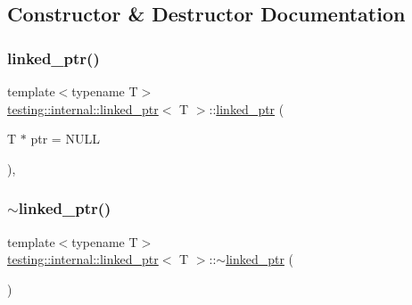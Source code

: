 \subsection{Constructor \& Destructor Documentation}
\mbox{\label{classtesting_1_1internal_1_1linked__ptr_ae805418b9f03f14ff49649e710475dba}} 
\subsubsection{\texorpdfstring{linked\+\_\+ptr()}{linked\_ptr()}\hspace{0.1cm}{\footnotesize\ttfamily [1/3]}}
{\footnotesize\ttfamily template$<$typename T$>$ \\
\hyperlink{classtesting_1_1internal_1_1linked__ptr}{testing\+::internal\+::linked\+\_\+ptr}$<$ T $>$\+::\hyperlink{classtesting_1_1internal_1_1linked__ptr}{linked\+\_\+ptr} (\begin{DoxyParamCaption}\item[{T $\ast$}]{ptr = {\ttfamily NULL} }\end{DoxyParamCaption})\hspace{0.3cm}{\ttfamily [inline]}, {\ttfamily [explicit]}}

\mbox{\label{classtesting_1_1internal_1_1linked__ptr_af99460fd09ca0f83e061ea480ef1a45e}} 
\subsubsection{\texorpdfstring{$\sim$linked\+\_\+ptr()}{~linked\_ptr()}}
{\footnotesize\ttfamily template$<$typename T$>$ \\
\hyperlink{classtesting_1_1internal_1_1linked__ptr}{testing\+::internal\+::linked\+\_\+ptr}$<$ T $>$\+::$\sim$\hyperlink{classtesting_1_1internal_1_1linked__ptr}{linked\+\_\+ptr} (\begin{DoxyParamCaption}{ }\end{DoxyParamCaption})\hspace{0.3cm}{\ttfamily [inline]}}

